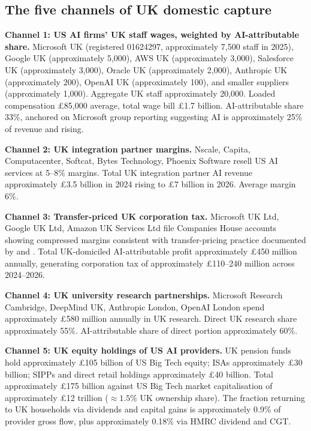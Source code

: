 \documentclass[11pt,letterpaper]{article}
\theoremstyle{remark}
\begin{document}
\subsection{The five channels of {UK} domestic capture}

\textbf{Channel 1: {US} {AI} firms' {UK} staff wages, weighted by {AI}-attributable share.} Microsoft {UK} (registered 01624297, approximately 7{,}500 staff in 2025), Google {UK} (approximately 5{,}000), {AWS} {UK} (approximately 3{,}000), Salesforce {UK} (approximately 3{,}000), Oracle {UK} (approximately 2{,}000), Anthropic {UK} (approximately 200), OpenAI {UK} (approximately 100), and smaller suppliers (approximately 1{,}000). Aggregate {UK} staff approximately 20{,}000. Loaded compensation \pounds85{,}000 average, total wage bill \pounds1.7 billion. {AI}-attributable share 33\%, anchored on Microsoft group reporting suggesting {AI} is approximately 25\% of revenue and rising.

\textbf{Channel 2: {UK} integration partner margins.} Nscale, Capita, Computacenter, Softcat, Bytes Technology, Phoenix Software resell {US} {AI} services at 5--8\% margins. Total {UK} integration partner {AI} revenue approximately \pounds3.5 billion in 2024 rising to \pounds7 billion in 2026. Average margin 6\%.

\textbf{Channel 3: Transfer-priced {UK} corporation tax.} Microsoft {UK} Ltd, Google {UK} Ltd, Amazon {UK} Services Ltd file Companies House accounts showing compressed margins consistent with transfer-pricing practice documented by \citet{torslov_wier_zucman_2018, torslov_wier_zucman_2023} and \citet{bilicka_2019}. Total {UK}-domiciled {AI}-attributable profit approximately \pounds450 million annually, generating corporation tax of approximately \pounds110--240 million across 2024--2026.

\textbf{Channel 4: {UK} university research partnerships.} Microsoft Research Cambridge, DeepMind {UK}, Anthropic London, OpenAI London spend approximately \pounds580 million annually in {UK} research. Direct {UK} research share approximately 55\%. {AI}-attributable share of direct portion approximately 60\%.

\textbf{Channel 5: {UK} equity holdings of {US} {AI} providers.} {UK} pension funds hold approximately \pounds105 billion of {US} Big Tech equity; {ISA}s approximately \pounds30 billion; {SIPPs} and direct retail holdings approximately \pounds40 billion. Total approximately \pounds175 billion against {US} Big Tech market capitalisation of approximately \pounds12 trillion ($\approx 1.5\%$ {UK} ownership share). The fraction returning to {UK} households via dividends and capital gains is approximately 0.9\% of provider gross flow, plus approximately 0.18\% via {HMRC} dividend and {CGT}.
\end{document}

